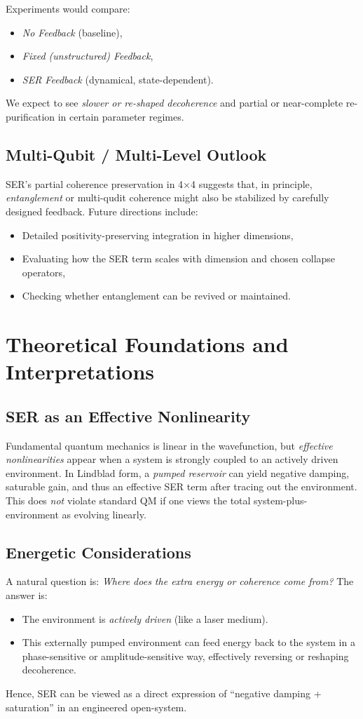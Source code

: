\documentclass[12pt]{article}
\begin{document}
Experiments would compare:
\begin{itemize}
\item \emph{No Feedback} (baseline),
\item \emph{Fixed (unstructured) Feedback},
\item \emph{SER Feedback} (dynamical, state-dependent).
\end{itemize}
We expect to see \emph{slower or re-shaped decoherence} and partial or near-complete re-purification in certain parameter regimes.

\subsection{Multi-Qubit / Multi-Level Outlook}
SER's partial coherence preservation in 4$\times$4 suggests that, in principle, \emph{entanglement} or multi-qudit coherence might also be stabilized by carefully designed feedback. Future directions include:
\begin{itemize}
\item Detailed positivity-preserving integration in higher dimensions,
\item Evaluating how the SER term scales with dimension and chosen collapse operators,
\item Checking whether entanglement can be revived or maintained.
\end{itemize}

\section{Theoretical Foundations and Interpretations}

\subsection{SER as an Effective Nonlinearity}
Fundamental quantum mechanics is linear in the wavefunction, but \emph{effective nonlinearities} appear when a system is strongly coupled to an actively driven environment. In Lindblad form, a \emph{pumped reservoir} can yield negative damping, saturable gain, and thus an effective SER term after tracing out the environment. This does \emph{not} violate standard QM if one views the total system-plus-environment as evolving linearly.

\subsection{Energetic Considerations}
A natural question is: \emph{Where does the extra energy or coherence come from?} The answer is:
\begin{itemize}
\item The environment is \emph{actively driven} (like a laser medium).
\item This externally pumped environment can feed energy back to the system in a phase-sensitive or amplitude-sensitive way, effectively reversing or reshaping decoherence.
\end{itemize}
Hence, SER can be viewed as a direct expression of ``negative damping + saturation'' in an engineered open-system.
\end{document}
